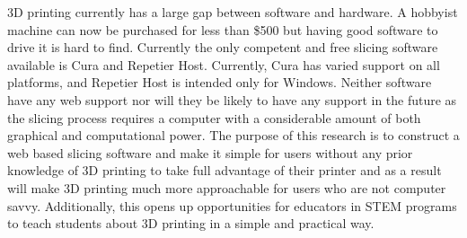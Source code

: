 % 
% 
%

3D printing currently has a large gap between software and hardware. A hobbyist machine can now be purchased for less than \$500 but having good software to drive it is hard to find. Currently the only competent and free slicing software available is Cura and Repetier Host. Currently, Cura has varied support on all platforms, and Repetier Host is intended only for Windows. Neither software have any web support nor will they be likely to have any support in the future as the slicing process requires a computer with a considerable amount of both graphical and computational power. The purpose of this research is to construct a web based slicing software and make it simple for users without any prior knowledge of 3D printing to take full advantage of their printer and as a result will make 3D printing much more approachable for users who are not computer savvy. Additionally, this opens up opportunities for educators in STEM programs to teach students about 3D printing in a simple and practical way.
